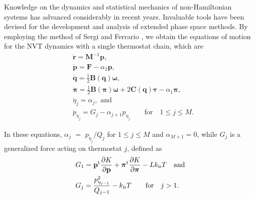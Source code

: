 \documentclass[
journal=jctcce,
layout=twocolumn
]{achemso}
\newcommand{\mt}[1]{\boldsymbol{\mathbf{#1}}}   %
\newcommand{\vt}[1]{\boldsymbol{\mathbf{#1}}}   %
\newcommand{\tr}[1]{#1^\text{t}}                %
\newcommand{\diff}[2]{\frac{\partial #1}{\partial #2}} %
\begin{document}
Knowledge on the dynamics and statistical mechanics of non-Hamiltonian systems has advanced considerably in recent years.\cite{Tuckerman_1999, Tuckerman_2001, Sergi_2001, Sergi_2003, Ezra_2004, Sergi_2004, Ezra_2006, Sergi_2010_2} Invaluable tools have been devised for the development and analysis of extended phase space methods.
By employing the method of Sergi and Ferrario \cite{Sergi_2001}, we obtain the equations of motion for the NVT dynamics with a single thermostat chain, which are
\begin{subequations}
	\label{eq:ODE system for NVT}
	\begin{align}
%
\label{eq:nhc_r}
	&\dot{\vt r} =
	{\mt M}^{-1} {\vt p}, \\
%
\label{eq:nhc_p} 
	&\dot{\vt p} =
	{\vt F} - \alpha_1 {\vt p},\\
%
\label{eq:nhc_q}
	&\dot{\vt q} =
	\frac{1}{2} \mt B(\vt q) \vt \omega, \\
%
\label{eq:nhc_pi}
	&\dot{\vt \pi} =
	\frac{1}{2} \mt B(\vt \pi) \vt \omega + 2 \mt C(\vt q) \vt \tau - \alpha_1 {\vt \pi}, \\
%
\label{eq:nhc_eta}
	&\dot{\eta}_j = \alpha_j, \text{ and} \\
%
\label{eq:nhc_p_eta}
	&{\dot p}_{\eta_j} = G_j - \alpha_{j+1} p_{\eta_j} \qquad \text{for} \quad 1 \leq j \le M.
	\end{align}
\end{subequations}

In these equations, $\alpha_j$ $=$ ${p_{\eta_j}}/{Q_j}$ for $1 \leq j \le M$ and $\alpha_{M+1} = 0$, while $G_j$ is a generalized force acting on thermostat $j$, defined as
\begin{subequations}
\begin{align}
\label{eq:generalized force NVT}
&G_1 = \tr{\vt p} \diff{K}{\vt p} + \tr{\vt \pi} \diff{K}{\vt \pi} - L k_\text{\tiny B} T \quad \text{and}\\
&G_j = \frac{p_{\eta_{j-1}}^2}{Q_{j-1}} - k_\text{\tiny B} T  \qquad \text{for} \quad j > 1.
\end{align}
\end{subequations}
\end{document}
